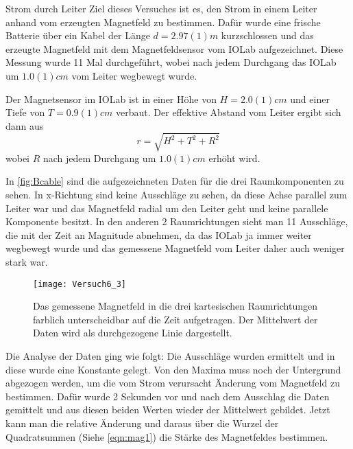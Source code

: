 \documentclass{alex_gp}
\begin{document}
\begin{mybox}{Strom durch Leiter}
	Ziel dieses Versuches ist es, den Strom in einem Leiter anhand vom erzeugten Magnetfeld zu bestimmen. Dafür wurde eine frische Batterie über ein Kabel der Länge \( d = 2.97(1) \unit{m} \) kurzschlossen und das erzeugte Magnetfeld mit dem Magnetfeldsensor vom IOLab aufgezeichnet. Diese Messung wurde 11 Mal durchgeführt, wobei nach jedem Durchgang das IOLab um \( 1.0 (1) \unit{cm} \) vom Leiter wegbewegt wurde. 
	
	Der Magnetsensor im IOLab ist in einer Höhe von \( H = 2.0(1) \unit{cm} \) und einer Tiefe von \( T = 0.9(1) \unit{cm} \) verbaut. Der effektive Abstand vom Leiter ergibt sich dann aus 
	\begin{equation}\label{eqn:r}
		r = \sqrt{H^2+T^2+R^2}
	\end{equation}
	wobei \( R \) nach jedem Durchgang um \( 1.0(1) \unit{cm} \) erhöht wird.
	
	In \autoref{fig:Bcable} sind die aufgezeichneten Daten für die drei Raumkomponenten zu sehen. In x-Richtung sind keine Ausschläge zu sehen, da diese Achse parallel zum Leiter war und das Magnetfeld radial um den Leiter geht und keine parallele Komponente besitzt. In den anderen 2 Raumrichtungen sieht man 11 Ausschläge, die mit der Zeit an Magnitude abnehmen, da das IOLab ja immer weiter wegbewegt wurde und das gemessene Magnetfeld vom Leiter daher auch weniger stark war.
	
	\begin{figure}[H]	
		\centering
		\texttt{[image: Versuch6\_3]}
		\caption{Das gemessene Magnetfeld in die drei kartesischen Raumrichtungen farblich unterscheidbar auf die Zeit aufgetragen. Der Mittelwert der Daten wird als durchgezogene Linie dargestellt.}
		\label{fig:Bcable}
	\end{figure}
	
	Die Analyse der Daten ging wie folgt: Die Ausschläge wurden ermittelt und in diese wurde eine Konstante gelegt.	Von den Maxima muss noch der Untergrund abgezogen werden, um die vom Strom verursacht Änderung vom Magnetfeld zu bestimmen. Dafür wurde 2 Sekunden vor und nach dem Ausschlag die Daten gemittelt und aus diesen beiden Werten wieder der Mittelwert gebildet. Jetzt kann man die relative Änderung und daraus über die Wurzel der Quadratsummen (Siehe \autoref{eqn:mag1}) die Stärke des Magnetfeldes bestimmen. 
	

\end{mybox}
\end{document}
